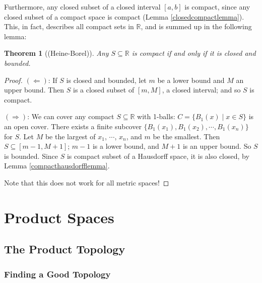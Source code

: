\documentclass[12pt]{report}
\newcommand{\reals}{\mathbb{R}}
\newcommand{\ball}[1]{B_{#1}}
\newtheorem{theorem}{Theorem}[section]
\begin{document}
Furthermore, any closed subset of a closed interval $[a,b]$ is compact,
since any closed subset of a compact space is compact (Lemma 
\ref{closedcompactlemma}).  This, in fact, describes all
compact sets in $\reals$, and is summed up in the following lemma: 

\begin{theorem}[(Heine-Borel)]
Any $S \subseteq \reals$ is compact if and only if it is closed and bounded.
\end{theorem}

\begin{proof}
$(\Leftarrow)$: If $S$ is closed and bounded, let $m$ be a lower bound and $M$
an upper bound. Then $S$ is a closed subset of $[m,M]$,
a closed interval; and so $S$ is compact.

$(\Rightarrow)$: We can cover any compact $S \subseteq \reals$ 
with 1-balls: $C = \{\ball{1}(x) \mid x \in S \}$ is an open cover. 
There exists a finite subcover $\{\ball{1}(x_1), \ball{1}(x_2), \cdots,
\ball{1}(x_n)\}$ for $S$. Let $M$ be the largest of $x_1$, $\cdots$, $x_n$, and
$m$ be the smallest. Then $S \subseteq [m-1, M+1]$; $m-1$ is a lower
bound, and $M+1$ is an upper bound. So $S$ is bounded. Since $S$ is 
compact subset of a Hausdorff space, it is also closed, by Lemma
\ref{compacthausdorfflemma}.

Note that this does not work for all metric spaces!
\end{proof}

\section{Product Spaces}
\subsection{The Product Topology}

\subsubsection{Finding a Good Topology}
\end{document}
